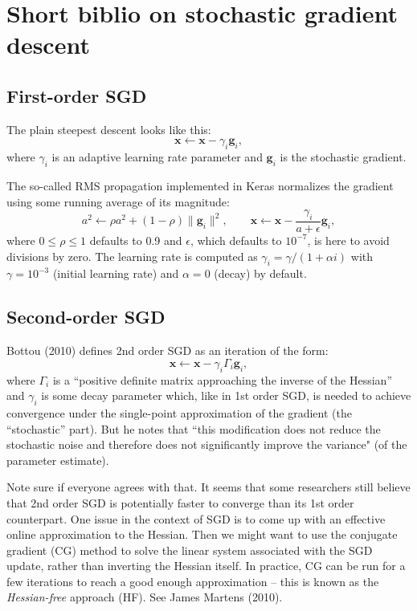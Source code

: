 \documentclass{article}
\def\x{{\mathbf{x}}}
\def\g{\mathbf{g}}
\begin{document}
\section{Short biblio on stochastic gradient descent}

\subsection{First-order SGD}

The plain steepest descent looks like this:
$$
\x \leftarrow \x - \gamma_i \g_i
,
$$
where $\gamma_i$ is an adaptive learning rate parameter and $\g_i$ is the stochastic gradient. 

The so-called RMS propagation implemented in Keras normalizes the gradient using some running average of its magnitude:
$$
a^2\leftarrow \rho a^2 + (1-\rho) \|\g_i\|^2,
\qquad
\x \leftarrow \x - \frac{\gamma_i}{a + \epsilon} \g_i,
$$
where $0\leq\rho\leq 1$ defaults to 0.9 and $\epsilon$, which defaults to $10^{-7}$, is  here to avoid divisions by zero. The learning rate is computed as $\gamma_i = \gamma/(1 + \alpha i)$ with $\gamma=10^{-3}$ (initial learning rate) and $\alpha=0$ (decay) by default.

\subsection{Second-order SGD}

Bottou (2010) defines 2nd order SGD as an iteration of the form:
$$
\x \leftarrow \x - \gamma_i \Gamma_i \g_i,
$$
where $\Gamma_i$ is a ``positive definite matrix approaching the inverse of the Hessian'' and $\gamma_i$ is some decay parameter which, like in 1st order SGD, is needed to achieve convergence under the single-point approximation of the gradient (the ``stochastic'' part). But he notes that ``this modification does not reduce the stochastic noise and therefore does not significantly improve the variance" (of the parameter estimate).

Note sure if everyone agrees with that. It seems that some researchers still believe that 2nd order SGD is potentially faster to converge than its 1st order counterpart. One issue in the context of SGD is to come up with an effective online approximation to the Hessian. Then we might want to use the conjugate gradient (CG) method to solve the linear system associated with the SGD update, rather than inverting the Hessian itself. In practice, CG can be run for a few iterations to reach a good enough approximation -- this is known as the {\em Hessian-free} approach (HF). See James Martens (2010). 
\end{document}
